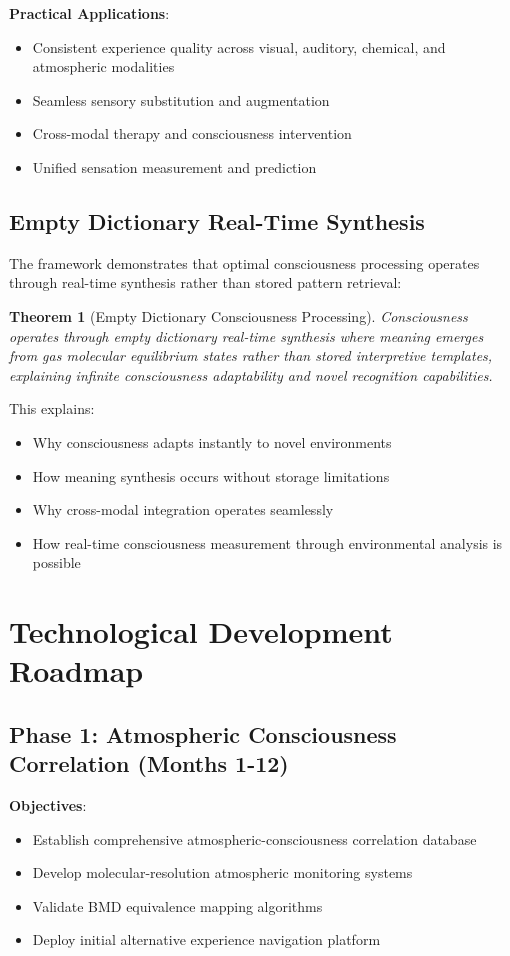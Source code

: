 \documentclass[12pt,a4paper]{article}
\newtheorem{theorem}{Theorem}
\begin{document}
\textbf{Practical Applications}:
\begin{itemize}
\item Consistent experience quality across visual, auditory, chemical, and atmospheric modalities
\item Seamless sensory substitution and augmentation
\item Cross-modal therapy and consciousness intervention
\item Unified sensation measurement and prediction
\end{itemize}

\subsection{Empty Dictionary Real-Time Synthesis}

The framework demonstrates that optimal consciousness processing operates through real-time synthesis rather than stored pattern retrieval:

\begin{theorem}[Empty Dictionary Consciousness Processing]
Consciousness operates through empty dictionary real-time synthesis where meaning emerges from gas molecular equilibrium states rather than stored interpretive templates, explaining infinite consciousness adaptability and novel recognition capabilities.
\end{theorem}

This explains:
\begin{itemize}
\item Why consciousness adapts instantly to novel environments
\item How meaning synthesis occurs without storage limitations
\item Why cross-modal integration operates seamlessly
\item How real-time consciousness measurement through environmental analysis is possible
\end{itemize}

\section{Technological Development Roadmap}

\subsection{Phase 1: Atmospheric Consciousness Correlation (Months 1-12)}

\textbf{Objectives}:
\begin{itemize}
\item Establish comprehensive atmospheric-consciousness correlation database
\item Develop molecular-resolution atmospheric monitoring systems
\item Validate BMD equivalence mapping algorithms
\item Deploy initial alternative experience navigation platform
\end{itemize}
\end{document}
